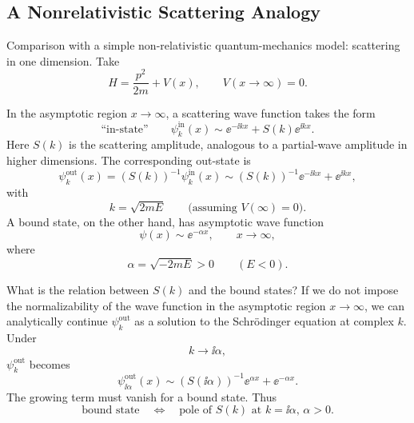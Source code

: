 \subsection{A Nonrelativistic Scattering Analogy}

Comparison with a simple non-relativistic quantum-mechanics model:
scattering in one dimension.  Take
\[
  H=\frac{p^2}{2m}+V(x),
  \qquad
  V(x\to\infty)=0.
\]

\begin{center}
\end{center}

In the asymptotic region \(x\to\infty\), a scattering wave function takes
the form
\[
  \text{``in-state''}\qquad
  \psi^{\mathrm{in}}_k(x)
  \sim
  \ee^{-\ii kx}+S(k)\ee^{\ii kx}.
\]
Here \(S(k)\) is the scattering amplitude, analogous to a partial-wave
amplitude in higher dimensions.  The corresponding out-state is
\[
  \psi^{\mathrm{out}}_k(x)
  =
  (S(k))^{-1}\psi^{\mathrm{in}}_k(x)
  \sim
  (S(k))^{-1}\ee^{-\ii kx}+\ee^{\ii kx},
\]
with
\[
  k=\sqrt{2mE}
  \qquad
  \text{(assuming \(V(\infty)=0\)).}
\]
A bound state, on the other hand, has asymptotic wave function
\[
  \psi(x)\sim \ee^{-\alpha x},
  \qquad x\to\infty,
\]
where
\[
  \alpha=\sqrt{-2mE}>0
  \qquad
  (E<0).
\]

What is the relation between \(S(k)\) and the bound states?  If we do
not impose the normalizability of the wave function in the asymptotic
region \(x\to\infty\), we can analytically continue
\(\psi_k^{\mathrm{out}}\) as a solution to the Schrödinger equation at
complex \(k\).  Under
\[
  k\to \ii\alpha,
\]
\(\psi_k^{\mathrm{out}}\) becomes
\[
  \psi^{\mathrm{out}}_{\ii\alpha}(x)
  \sim
  (S(\ii\alpha))^{-1}\ee^{\alpha x}+\ee^{-\alpha x}.
\]
The growing term must vanish for a bound state.  Thus
\[
  \text{bound state}
  \quad\Longleftrightarrow\quad
  \text{pole of \(S(k)\) at \(k=\ii\alpha\), \(\alpha>0\).}
\]

